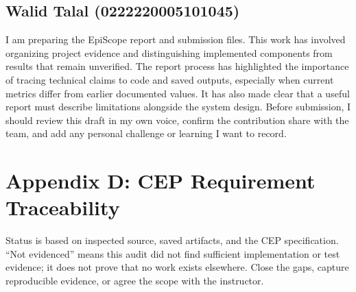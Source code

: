 ﻿\documentclass[conference]{IEEEtran}
\begin{document}
\subsection*{Walid Talal (0222220005101045)}
I am preparing the EpiScope report and submission files. This work has involved organizing project evidence and distinguishing implemented components from results that remain unverified. The report process has highlighted the importance of tracing technical claims to code and saved outputs, especially when current metrics differ from earlier documented values. It has also made clear that a useful report must describe limitations alongside the system design. Before submission, I should review this draft in my own voice, confirm the contribution share with the team, and add any personal challenge or learning I want to record.

\clearpage
\section*{Appendix D: CEP Requirement Traceability}
Status is based on inspected source, saved artifacts, and the CEP specification. ``Not evidenced'' means this audit did not find sufficient implementation or test evidence; it does not prove that no work exists elsewhere. Close the gaps, capture reproducible evidence, or agree the scope with the instructor.
\end{document}
